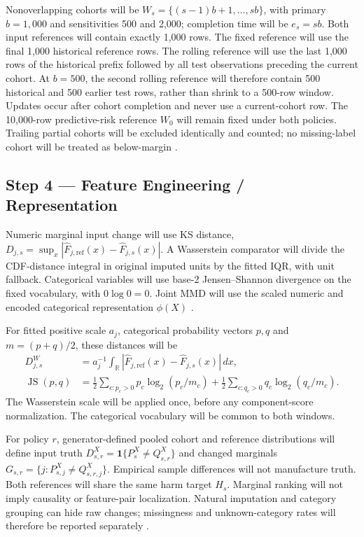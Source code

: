 \documentclass[11pt,a4paper]{article}
\newcommand{\ind}{\mathbf{1}}
\begin{document}
Nonoverlapping cohorts will be $W_s=\{(s-1)b+1,\ldots,sb\}$, with primary
$b=1{,}000$ and sensitivities 500 and 2,000; completion time will be $e_s=sb$.
Both input references will contain
exactly 1,000 rows. The fixed reference will use the final 1,000 historical
reference rows. The rolling reference will use the last 1,000 rows of the
historical prefix followed by all test observations preceding the current
cohort. At $b=500$, the second rolling reference will therefore contain 500
historical and 500 earlier test rows, rather than shrink to a 500-row window.
Updates occur after cohort completion and never use a current-cohort row.
The 10,000-row predictive-risk reference $W_0$ will remain
fixed under both policies. Trailing partial cohorts will be excluded identically
and counted; no missing-label cohort will be treated as below-margin
\cite{window,souza}.

\subsection*{Step 4 --- Feature Engineering / Representation}
Numeric marginal input change will use KS distance,
$D_{j,s}=\sup_x|\widehat F_{j,\mathrm{ref}}(x)-\widehat F_{j,s}(x)|$.
A Wasserstein comparator will divide the CDF-distance integral in original
imputed units by the fitted IQR, with unit fallback. Categorical variables will
use base-2 Jensen--Shannon divergence on the fixed vocabulary, with
$0\log0=0$. Joint MMD will use the scaled numeric and encoded categorical
representation $\phi(X)$ \cite{greco,szucs,gretton}.

For fitted positive scale $a_j$, categorical probability vectors $p,q$ and
$m=(p+q)/2$, these distances will be
\begin{align}
D^W_{j,s}&=a_j^{-1}\int_{\mathbb R}
 |\widehat F_{j,\mathrm{ref}}(x)-\widehat F_{j,s}(x)|\,dx,\\
\operatorname{JS}(p,q)&=\tfrac12\sum_{c:p_c>0}p_c\log_2(p_c/m_c)
 +\tfrac12\sum_{c:q_c>0}q_c\log_2(q_c/m_c).
\end{align}
The Wasserstein scale will be applied once, before any component-score
normalization. The categorical vocabulary will be common to both windows.

For policy $r$, generator-defined pooled cohort and reference distributions
will define input truth $D^X_{s,r}=\ind\{P_s^X\ne Q_{s,r}^X\}$ and changed
marginals $G_{s,r}=\{j:P_{s,j}^X\ne Q_{s,r,j}^X\}$. Empirical sample
differences will not manufacture truth. Both references will share the same
harm target $H_s$. Marginal ranking will not imply causality or feature-pair
localization. Natural imputation and category grouping can hide raw changes;
missingness and unknown-category rates will therefore be reported separately
\cite{window,causal,szucs}.
\end{document}
